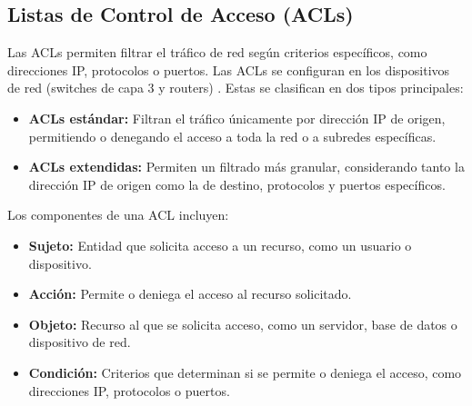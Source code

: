 \subsection{Listas de Control de Acceso (ACLs)}
\label{subsec:acl}
Las ACLs permiten filtrar el tráfico de red según criterios específicos, como direcciones IP, protocolos o puertos. Las ACLs se configuran en los dispositivos de red (switches de capa 3 y routers) \cite{cisco-hospital-design}. Estas se 
clasifican en dos tipos principales:

\begin{itemize}
    \item \textbf{ACLs estándar:} Filtran el tráfico únicamente por dirección IP de origen, permitiendo o denegando el acceso a toda la red o a subredes específicas.
    \item \textbf{ACLs extendidas:} Permiten un filtrado más granular, considerando tanto la dirección IP de origen como la de destino, protocolos y puertos específicos.
\end{itemize}

Los componentes de una ACL incluyen:
\begin{itemize}
    \item \textbf{Sujeto:} Entidad que solicita acceso a un recurso, como un usuario o dispositivo.
    \item \textbf{Acción:} Permite o deniega el acceso al recurso solicitado.
    \item \textbf{Objeto:} Recurso al que se solicita acceso, como un servidor, base de datos o dispositivo de red.
    \item \textbf{Condición:} Criterios que determinan si se permite o deniega el acceso, como direcciones IP, protocolos o puertos.
\end{itemize}

